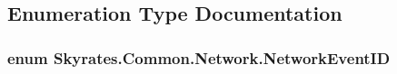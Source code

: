 \subsection{Enumeration Type Documentation}
\hypertarget{namespace_skyrates_1_1_common_1_1_network_a90fc6faa44c44b4284114e861d3e761a}{
\subsubsection[{Network\-Event\-I\-D}]{\setlength{\rightskip}{0pt plus 5cm}enum {\bf Skyrates.\-Common.\-Network.\-Network\-Event\-I\-D}}}\label{namespace_skyrates_1_1_common_1_1_network_a90fc6faa44c44b4284114e861d3e761a}
